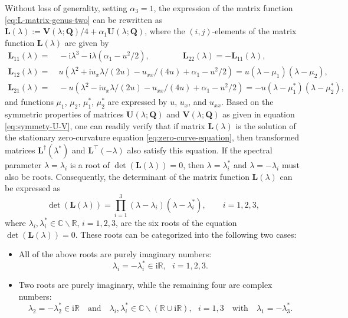 \documentclass[11pt,reqno]{amsart}
\newcommand{\ii}{\mathrm{i}}
\numberwithin{equation}{section}
\begin{document}
Without loss of generality, setting $\alpha_3=1$, the expression of the matrix function \eqref{eq:L-matrix-genus-two} can be rewritten as $\mathbf{L}(\lambda):=\mathbf{V}(\lambda;\mathbf{Q})/4+\alpha_1 \mathbf{U}(\lambda;\mathbf{Q})$, where the $(i,j)$-elements of the matrix function $\mathbf{L}(\lambda)$ are given by
\begin{equation}\label{eq:L-elements}
	\begin{split}
		\mathbf{L}_{11}(\lambda)=&\  -\ii \lambda^3 -\ii\lambda (\alpha_1-u^2/2), \qquad \qquad \mathbf{L}_{22}(\lambda)=-\mathbf{L}_{11}(\lambda), \\
		\mathbf{L}_{12}(\lambda)=&\ u\left(\lambda^2+\ii u_x \lambda /(2u) -u_{xx}/(4u)+\alpha_1-u^2/2\right)= u(\lambda-\mu_1)(\lambda-\mu_2),\\
		\mathbf{L}_{21}(\lambda)=&\ -u\left(\lambda^2-\ii u_x \lambda /(2u) -u_{xx}/(4u)+\alpha_1-u^2/2\right)= -u(\lambda-\mu_1^*)(\lambda-\mu_2^*),
	\end{split}
\end{equation}
 and functions $\mu_1$, $\mu_2$, $\mu_1^*$, $\mu_2^*$ are expressed by $u$, $u_x$, and $u_{xx}$.
Based on the symmetric properties of matrices $\mathbf{U}(\lambda;\mathbf{Q})$ and $\mathbf{V}(\lambda;\mathbf{Q})$ as given in equation \eqref{eq:symmety-U-V}, one can readily verify that if matrix $\mathbf{L}(\lambda)$ is the solution of the stationary zero-curvature equation \eqref{eq:zero-curve-equation}, then transformed matrices $\mathbf{L}^{\dagger}(\lambda^*)$ and $\mathbf{L}^{\top}(-\lambda)$ also satisfy this equation.
If the spectral parameter $\lambda=\lambda_i$ is a root of $\det(\mathbf{L}(\lambda))=0$, then $\lambda=\lambda_i^*$ and $\lambda=-\lambda_i$ must also be roots.
Consequently, the determinant of the matrix function $\mathbf{L}(\lambda)$ can be expressed as
\begin{equation}\label{eq:det-L-lambda}
	\det\left(\mathbf{L}(\lambda)\right)
	=\prod_{i=1}^{3}(\lambda-\lambda_i)(\lambda-\lambda_i^*), \qquad i=1,2,3,
\end{equation}
where $\lambda_i,\lambda_i^* \in \mathbb{C}\backslash \mathbb{R}$, $i=1,2,3$, are the six roots of the equation $\det\left(\mathbf{L}(\lambda)\right)=0$.
These roots can be categorized into the following two cases:
\begin{itemize}
	\item[\textbf{Case 1:}] All of the above roots are purely imaginary numbers:
	\begin{equation}\label{case1}\tag{Case 1}
	\lambda_i=-\lambda_i^*\in \ii \mathbb{R},\,\,\,\, i=1,2,3.
	\end{equation}
	\item[\textbf{Case 2:}] Two roots are purely imaginary, while the remaining four are complex numbers:
	\begin{equation}\label{case2}\tag{Case 2} 
	\lambda_2=-\lambda_2^*\in \ii \mathbb{R}\quad\text{and}\quad \lambda_i,\lambda_i^*\in \mathbb{C}\backslash(\mathbb{R}\cup \ii \mathbb{R}), \,\,\,\, i=1,3 \quad\text{with}\quad \lambda_1=-\lambda_3^*.
	\end{equation}
\end{itemize} 
\end{document}
